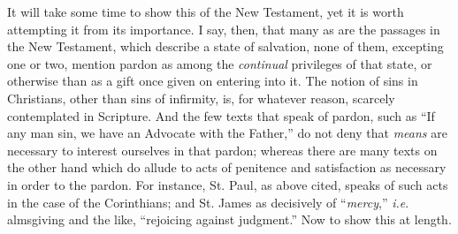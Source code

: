 It will take some time to show this of the New Testament, yet it is
worth attempting it from its importance. I say, then, that many as are
the passages in the New Testament, which describe a state of
salvation, none of them, excepting one or two, mention pardon as among
the \emph{continual} privileges of that state, or otherwise than as a
gift once given on entering into it. The notion of sins in Christians,
other than sins of infirmity, is, for whatever reason, scarcely
contemplated in Scripture. And the few texts that speak of pardon,
such as ``If any man sin, we have an Advocate with the
Father,'' do not deny that \emph{means} are necessary to interest
ourselves in that pardon; whereas there are many texts on the other
hand which do allude to acts of penitence and satisfaction as
necessary in order to the pardon. For instance, St. Paul, as above
cited, speaks of such acts in the case of the Corinthians; and St.
James as decisively of ``\emph{mercy},'' \emph{i.e}.
almsgiving and the like, ``rejoicing against judgment.'' Now
to show this at length.


